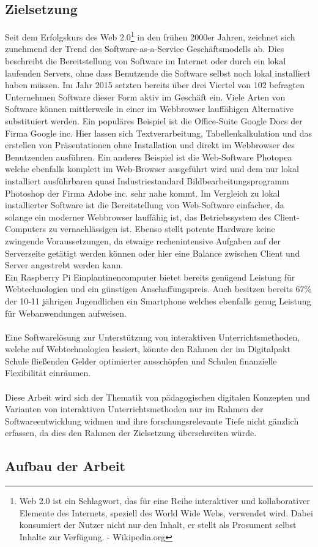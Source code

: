 \subsection{Zielsetzung}\label{sec:zielsetzung}
Seit dem Erfolgskurs des Web 2.0\footnote{Web 2.0 ist ein Schlagwort, das für eine Reihe interaktiver und kollaborativer Elemente des Internets, speziell des World Wide Webs, verwendet wird. Dabei konsumiert der Nutzer nicht nur den Inhalt, er stellt als Prosument selbst Inhalte zur Verfügung. - Wikipedia.org} in den frühen 2000er Jahren, zeichnet sich zunehmend der Trend des Software-as-a-Service Geschäftsmodells ab. Dies beschreibt die Bereitstellung von Software im Internet oder durch ein lokal laufenden Servers, ohne dass Benutzende die Software selbst noch lokal installiert haben müssen. Im Jahr 2015 setzten bereits über drei Viertel von 102 befragten Unternehmen Software dieser Form aktiv im Geschäft ein\cite{TecArt-GmbH2019:online}. Viele Arten von Software können  mittlerweile in einer im Webbrowser lauffähigen Alternative substituiert werden. Ein populäres Beispiel ist die Office-Suite Google Docs der Firma Google inc. Hier lassen sich Textverarbeitung, Tabellenkalkulation und das erstellen von Präsentationen ohne Installation und direkt im Webbrowser des Benutzenden ausführen. Ein anderes Beispiel ist die Web-Software Photopea welche ebenfalls komplett im Web-Browser ausgeführt wird und dem nur lokal installiert ausführbaren quasi Industriestandard Bildbearbeitungsprogramm Photoshop der Firma Adobe inc. sehr nahe kommt. Im Vergleich zu lokal installierter Software ist die Bereitstellung von Web-Software einfacher, da solange ein moderner Webbrowser lauffähig ist, das Betriebssystem des Client-Computers zu vernachlässigen ist. Ebenso stellt potente Hardware keine zwingende Voraussetzungen, da etwaige rechenintensive Aufgaben auf der Serverseite getätigt werden können oder hier eine Balance zwischen Client und Server angestrebt werden kann. \\ 
Ein Raspberry Pi Einplantinencomputer bietet bereits genügend Leistung für Webtechnologien und ein günstigen Anschaffungspreis. Auch besitzen bereits 67\% der 10-11 jährigen Jugendlichen ein Smartphone \cite{Statista2017:online} welches ebenfalls genug Leistung für Webanwendungen aufweisen. \\ \\ Eine Softwarelösung zur Unterstützung von interaktiven Unterrichtsmethoden, welche auf Webtechnologien basiert, könnte den Rahmen der im Digitalpakt Schule fließenden Gelder optimierter ausschöpfen und Schulen finanzielle Flexibilität einräumen. 
\\ \\
Diese Arbeit wird sich der Thematik von pädagogischen digitalen Konzepten und Varianten von interaktiven Unterrichtsmethoden nur im Rahmen der Softwareentwicklung widmen und ihre forschungsrelevante Tiefe nicht gänzlich erfassen, da dies den Rahmen der Zielsetzung überschreiten würde.

\newpage

\subsection{Aufbau der Arbeit}

   
